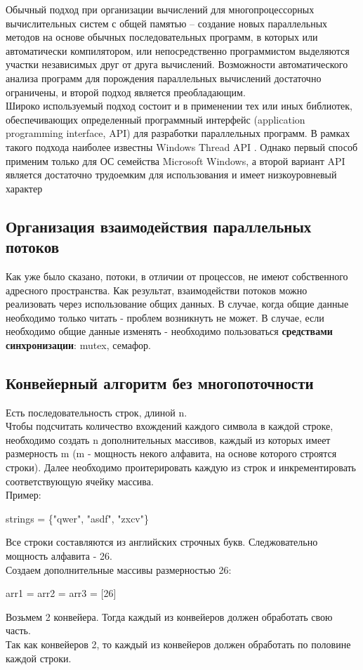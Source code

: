 \documentclass[12pt,a4paper]{article}
\numberwithin{equation}{section}
\begin{document}
Обычный подход при организации вычислений для многопроцессорных вычислительных систем с общей памятью – создание новых параллельных методов на основе обычных
последовательных программ, в которых или автоматически компилятором, или непосредственно программистом выделяются участки независимых друг от друга вычислений. Возможности автоматического анализа программ для порождения параллельных вычислений достаточно ограничены, и второй подход является преобладающим.\\

Широко используемый подход состоит и в применении тех или иных библиотек, обеспечивающих определенный программный интерфейс (application programming interface,
API) для разработки параллельных программ. В рамках такого подхода наиболее известны Windows Thread API \cite{litlink1}. Однако первый способ применим только для ОС семейства
Microsoft Windows, а второй вариант API является достаточно трудоемким для использования и имеет низкоуровневый характер

\subsection {Организация взаимодействия параллельных потоков}
Как уже было сказано, потоки, в отличии от процессов, не имеют собственного адресного пространства. Как результат, взаимодействи потоков можно реализовать через использование общих данных. В случае, когда общие данные необходимо только читать - проблем возникнуть не может. В случае, если необходимо общие данные изменять - необходимо пользоваться \textbf{средствами синхронизации}: mutex, семафор.

\subsection{Конвейерный алгоритм без многопоточности}
Есть последовательность строк, длиной n.\\
Чтобы подсчитать количество вхождений каждого символа в каждой строке, необходимо создать n дополнительных массивов, каждый из которых имеет размерность m (m - мощность некого алфавита, на основе которого строятся строки).
Далее необходимо проитерировать каждую из строк и инкрементировать соответствующую ячейку массива.\\
Пример:
\begin{center}
	strings = \{"qwer"{}, "asdf"{}, "zxcv"{}\}
\end{center}
Все строки составляются из английских строчных букв. Следжовательно мощность алфавита - 26.\\
Создаем дополнительные массивы размерностью 26:
\begin{center}
	arr1 = arr2 = arr3 = [26]\\
\end{center}
Возьмем 2 конвейера. Тогда каждый из конвейеров должен обработать свою часть.\\
Так как конвейеров 2, то каждый из конвейеров должен обработать по половине каждой строки.\\
\end{document}
